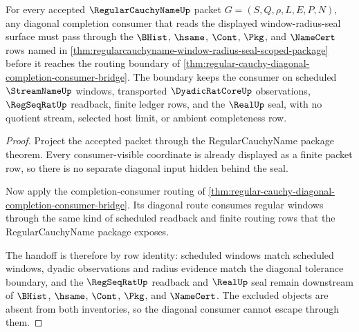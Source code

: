 \begin{theorem}
\label{thm:regularcauchyname-diagonal-window-consumer-boundary}
For every accepted $\RegularCauchyNameUp$ packet $G=(S,Q,\rho,L,E,P,N)$, any diagonal completion consumer that reads the displayed window-radius-seal surface must pass through the $\BHist$, $\hsame$, $\Cont$, $\Pkg$, and $\NameCert$ rows named in \autoref{thm:regularcauchyname-window-radius-seal-scoped-package} before it reaches the routing boundary of \autoref{thm:regular-cauchy-diagonal-completion-consumer-bridge}. The boundary keeps the consumer on scheduled $\StreamNameUp$ windows, transported $\DyadicRatCoreUp$ observations, $\RegSeqRatUp$ readback, finite ledger rows, and the $\RealUp$ seal, with no quotient stream, selected host limit, or ambient completeness row.
\end{theorem}
\begin{proof}
Project the accepted packet through the RegularCauchyName package theorem. Every consumer-visible coordinate is already displayed as a finite packet row, so there is no separate diagonal input hidden behind the seal.

Now apply the completion-consumer routing of \autoref{thm:regular-cauchy-diagonal-completion-consumer-bridge}. Its diagonal route consumes regular windows through the same kind of scheduled readback and finite routing rows that the RegularCauchyName package exposes.

The handoff is therefore by row identity: scheduled windows match scheduled windows, dyadic observations and radius evidence match the diagonal tolerance boundary, and the $\RegSeqRatUp$ readback and $\RealUp$ seal remain downstream of $\BHist$, $\hsame$, $\Cont$, $\Pkg$, and $\NameCert$. The excluded objects are absent from both inventories, so the diagonal consumer cannot escape through them.
\end{proof}

